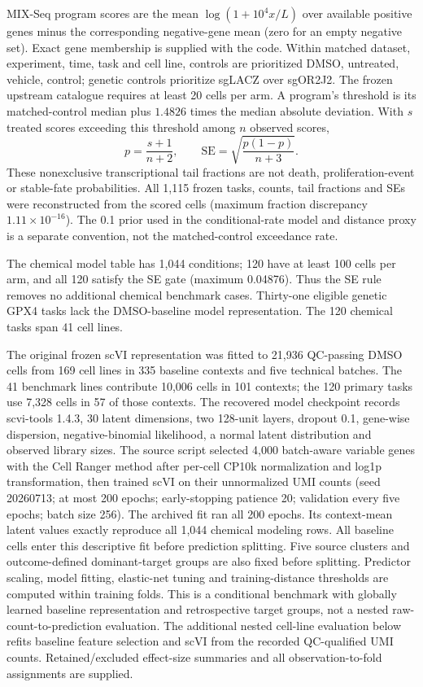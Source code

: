 \documentclass[a4paper,fleqn]{cas-sc}
\makeatletter
\DeclareRobustCommand{\rev}[1]{{\color{red}\def\@citecolor{black}\def\@linkcolor{red}\def\@urlcolor{red}#1}}
\makeatother
\begin{document}
MIX-Seq program scores are the mean $\log(1+10^4x/L)$ over available positive genes minus the corresponding negative-gene mean (zero for an empty negative set). Exact gene membership is supplied with the code. Within matched dataset, experiment, time, task and cell line, controls are prioritized DMSO, untreated, vehicle, control; genetic controls prioritize sgLACZ over sgOR2J2. The frozen upstream catalogue requires at least 20 cells per arm. A program's threshold is its matched-control median plus $1.4826$ times the median absolute deviation. \rev{With $s$ treated scores exceeding this threshold among $n$ observed scores,
{}
{\color{red}
\[
p=\frac{s+1}{n+2},\qquad \mathrm{SE}=\sqrt{\frac{p(1-p)}{n+3}}.
\]
}
\rev{}
These nonexclusive transcriptional tail fractions are not death, proliferation-event or stable-fate probabilities. All 1,115 frozen tasks, counts, tail fractions and SEs were reconstructed from the scored cells (maximum fraction discrepancy $1.11\times10^{-16}$). The 0.1 prior used in the conditional-rate model and distance proxy is a separate convention, not the matched-control exceedance rate.}

The chemical model table has 1,044 conditions; 120 have at least 100 cells per arm, and all 120 satisfy the SE gate (maximum 0.04876). Thus the SE rule removes no additional chemical benchmark cases. Thirty-one eligible genetic GPX4 tasks lack the DMSO-baseline model representation. The 120 chemical tasks span 41 cell lines.

The original frozen scVI representation was fitted to 21,936 QC-passing DMSO cells from 169 cell lines in 335 baseline contexts and five technical batches. The 41 benchmark lines contribute 10,006 cells in 101 contexts; the 120 primary tasks use 7,328 cells in 57 of those contexts. The recovered model checkpoint records scvi-tools 1.4.3, 30 latent dimensions, two 128-unit layers, dropout 0.1, gene-wise dispersion, negative-binomial likelihood, a normal latent distribution and observed library sizes. The source script selected 4,000 batch-aware variable genes with the Cell Ranger method after per-cell CP10k normalization and log1p transformation, then trained scVI on their unnormalized UMI counts (seed 20260713; at most 200 epochs; early-stopping patience 20; validation every five epochs; batch size 256). The archived fit ran all 200 epochs. Its context-mean latent values exactly reproduce all 1,044 chemical modeling rows. All baseline cells enter this descriptive fit before prediction splitting. Five source clusters and outcome-defined dominant-target groups are also fixed before splitting. Predictor scaling, model fitting, elastic-net tuning and training-distance thresholds are computed within training folds. This is a conditional benchmark with globally learned baseline representation and retrospective target groups, not a nested raw-count-to-prediction evaluation. The additional nested cell-line evaluation below refits baseline feature selection and scVI from the recorded QC-qualified UMI counts. Retained/excluded effect-size summaries and all observation-to-fold assignments are supplied.
\end{document}
